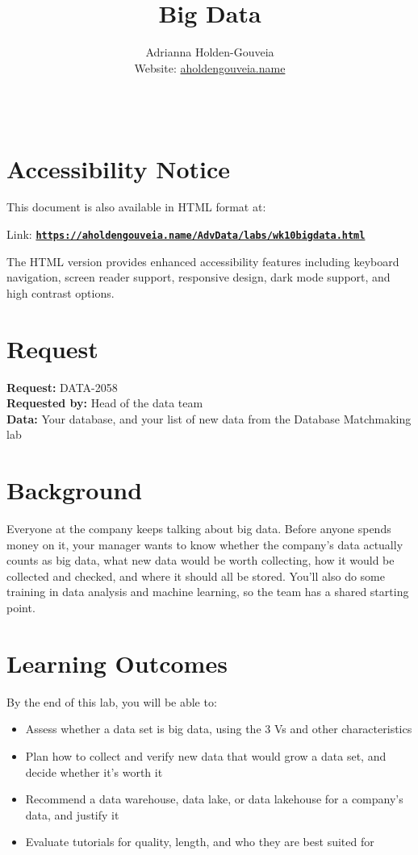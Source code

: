 \documentclass[12pt]{article}
\title{Big Data}
\author{
        Adrianna Holden-Gouveia \\
        Website: \href{https://aholdengouveia.name}{aholdengouveia.name}\\ 
        \date{\vspace{-5ex}}
        \faGithub {: aholdengouveia} \\
        }
\begin{document}
    

\maketitle



\section*{Accessibility Notice}
This document is also available in HTML format at:

Link: \href{https://aholdengouveia.name/AdvData/labs/wk10bigdata.html}{\textbf{\nolinkurl{https://aholdengouveia.name/AdvData/labs/wk10bigdata.html}}}

The HTML version provides enhanced accessibility features including keyboard navigation, screen reader support, responsive design, dark mode support, and high contrast options.

\section*{Request}
\noindent\textbf{Request:} DATA-2058\\
\textbf{Requested by:} Head of the data team\\
\textbf{Data:} Your database, and your list of new data from the Database Matchmaking lab

\section*{Background}
Everyone at the company keeps talking about big data. Before anyone spends money on it, your manager wants to know whether the company's data actually counts as big data, what new data would be worth collecting, how it would be collected and checked, and where it should all be stored. You'll also do some training in data analysis and machine learning, so the team has a shared starting point.

\section*{Learning Outcomes}
By the end of this lab, you will be able to:
\begin{itemize}
    \item Assess whether a data set is big data, using the 3 Vs and other characteristics
    \item Plan how to collect and verify new data that would grow a data set, and decide whether it's worth it
    \item Recommend a data warehouse, data lake, or data lakehouse for a company's data, and justify it
    \item Evaluate tutorials for quality, length, and who they are best suited for
\end{itemize}
\end{document}
